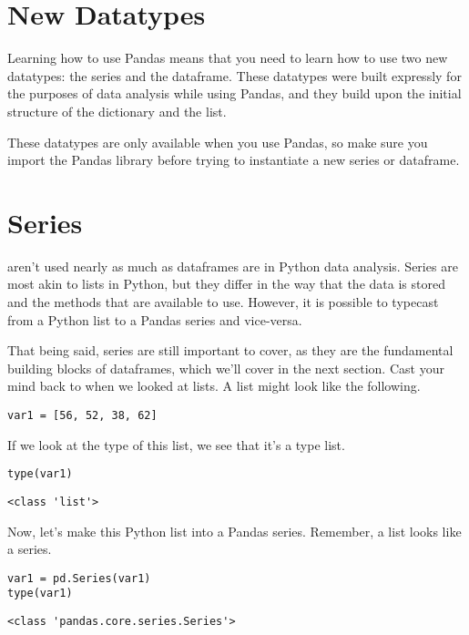 \section{New Datatypes}
Learning how to use Pandas means that you need to learn how to use two new datatypes: the series and the dataframe. These datatypes were built expressly for the purposes of data analysis while using Pandas, and they build upon the initial structure of the dictionary and the list.\par
These datatypes are only available when you use Pandas, so make sure you import the Pandas library before trying to instantiate a new series or dataframe.
\section{Series}
 aren't used nearly as much as dataframes are in Python data analysis. Series are most akin to lists in Python, but they differ in the way that the data is stored and the methods that are available to use. However, it is possible to typecast from a Python list to a Pandas series and vice-versa.\par
That being said, series are still important to cover, as they are the fundamental building blocks of dataframes, which we'll cover in the next section. Cast your mind back to when we looked at lists. A list might look like the following.
\begin{lstlisting}[style=pippython]
var1 = [56, 52, 38, 62]
\end{lstlisting}
If we look at the type of this list, we see that it's a type list.
\begin{lstlisting}[style=pippython]
type(var1)
\end{lstlisting}
\begin{lstlisting}
<class 'list'>
\end{lstlisting}
Now, let's make this Python list into a Pandas series. Remember, a list looks like a series.\par
\begin{lstlisting}[style=pippython]
var1 = pd.Series(var1)
type(var1)
\end{lstlisting}
\begin{lstlisting}
<class 'pandas.core.series.Series'>
\end{lstlisting}
